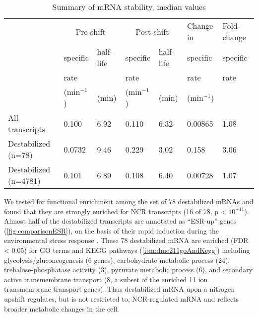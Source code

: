 \begin{table}[h]
\small
\caption{\label{tab:table1} Summary of mRNA stability, median values}
\begin{tabular}{p{8em} | l | l | l | l | l | l}
& \multicolumn{2}{c}{Pre-shift} & \multicolumn{2}{c}{Post-shift} &
Change in & Fold-change\\
 & specific & half-life & specific  & half-life & specific & specific \\
 & rate & & rate & & rate & rate \\
 & (min$^{-1}$) & (min) & (min$^{-1}$) & (min) & (min$^{-1}$) & \\
\midrule
\raggedright All transcripts & 0.100 & 6.92 & 0.110 & 6.32 & 0.00865 & 1.08\\
\midrule
\raggedright Destabilized (n=78) & 0.0732 & 9.46 & 0.229 & 3.02 & 0.158 & 3.06\\
\midrule
\raggedright Destabilized (n=4781) & 0.101 & 6.89 & 0.108 & 6.40 & 0.00728 & 1.07\\
\bottomrule
\end{tabular}
\end{table}


We tested for
functional enrichment among the set of 78 destabilized
mRNAs and found that they are strongly enriched for NCR
transcripts (16 of 78, p < $10^{-11}$). Almost half of the
destabilized transcripts are annotated as “ESR-up” genes
(\autoref{fig:comparisonESR}), on the basis of  their rapid induction
during the environmental stress response \parencite{gasch2000genomic}. These 78
destabilized mRNA are enriched (FDR < 0.05) for GO terms and KEGG 
pathways (\autoref{itm:dme211goAndKegg}) including
glycolysis/gluconeogenesis (6 genes), 
carbohydrate metabolic process (24),
trehalose-phosphatase activity (3), 
pyruvate metabolic process (6), 
and secondary active transmembrane transport
(8, a subset of the enriched 11 ion transmembrane transport genes).
Thus destabilized mRNA upon a nitrogen upshift regulates, 
but is not restricted to, NCR-regulated mRNA and reflects broader
metabolic changes in the cell. 




